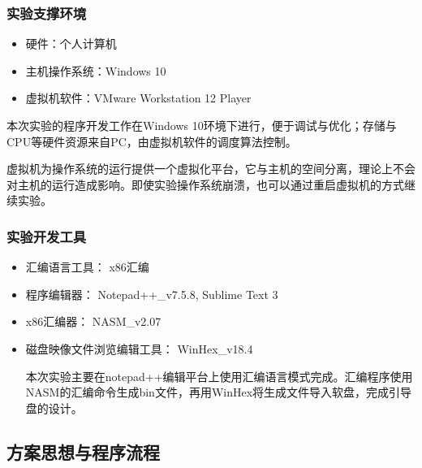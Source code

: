 \documentclass[a4paper,11pt,UTF8]{ctexart}
\begin{document}
\subsubsection{实验支撑环境}
	\begin{itemize} 
		\item 硬件：个人计算机
		\item 主机操作系统：Windows 10
		\item 虚拟机软件：VMware Workstation 12 Player
	\end{itemize}
	
	
	本次实验的程序开发工作在Windows 10环境下进行，便于调试与优化；存储与CPU等硬件资源来自PC，由虚拟机软件的调度算法控制。
	
	虚拟机为操作系统的运行提供一个虚拟化平台，它与主机的空间分离，理论上不会对主机的运行造成影响。即使实验操作系统崩溃，也可以通过重启虚拟机的方式继续实验。 
\subsubsection{实验开发工具}

	\begin{itemize} 
	\item 汇编语言工具： x86汇编
	\item 程序编辑器： Notepad++\_v7.5.8, Sublime Text 3
	\item x86汇编器： NASM\_v2.07
	\item 磁盘映像文件浏览编辑工具： WinHex\_v18.4
	
	本次实验主要在notepad++编辑平台上使用汇编语言模式完成。汇编程序使用NASM的汇编命令生成bin文件，再用WinHex将生成文件导入软盘，完成引导盘的设计。
\end{itemize}

\subsection{方案思想与程序流程}
\end{document}
